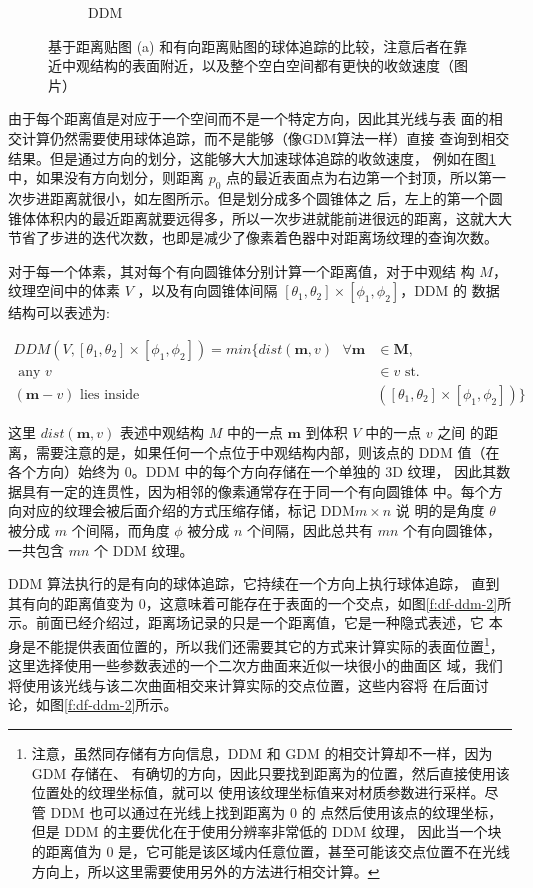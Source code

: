 \begin{figure}
\begin{subfigure}[b]{0.5\textwidth}
		\caption{DDM}
	\end{subfigure}
	\caption{基于距离贴图 (a) 和有向距离贴图的球体追踪的比较，注意后者在靠近中观结构的表面附近，以及整个空白空间都有更快的收敛速度（图片\cite{a:directional-distance-maps}）}
	\label{f:df-ddm-comparision}
\end{figure}

由于每个距离值是对应于一个空间而不是一个特定方向，因此其光线与表 面的相交计算仍然需要使用球体追踪，而不是能够（像GDM算法一样）直接 查询到相交结果。但是通过方向的划分，这能够大大加速球体追踪的收敛速度， 例如在图\ref{f:df-ddm-comparision}中，如果没有方向划分，则距离 $p_0$ 点的最近表面点为右边第一个封顶，所以第一次步进距离就很小，如左图所示。但是划分成多个圆锥体之 后，左上的第一个圆锥体体积内的最近距离就要远得多，所以一次步进就能前进很远的距离，这就大大节省了步进的迭代次数，也即是减少了像素着色器中对距离场纹理的查询次数。

对于每一个体素，其对每个有向圆锥体分别计算一个距离值，对于中观结 构 $M$，纹理空间中的体素 $V$ ，以及有向圆锥体间隔 $[\theta_1, \theta_2] \times [\phi_1, \phi_2]$，DDM 的 数据结构可以表述为:

\begin{equation}
\begin{split}
	DDM(V,[\theta_{1},\theta_{2}]\times [\phi_{1},\phi_{2}])=min\{dist(\mathbf{m},{v})\textrm{ }\forall\mathbf{m} & \in\mathbf{M},\\
	\textrm{ any } {v} & \in{v} \textrm{ st. } \\
	(\mathbf{m}-{v}) \textrm{ lies inside }&([\theta_{1},\theta_{2}]\times [\phi_{1},\phi_{2}])\}
\end{split}
\end{equation}

这里 $dist(\mathbf{m}, {v})$ 表述中观结构 $M$ 中的一点 $\mathbf{m}$ 到体积 $V$ 中的一点 ${v}$ 之间 的距离，需要注意的是，如果任何一个点位于中观结构内部，则该点的 DDM 值（在各个方向）始终为 0。DDM 中的每个方向存储在一个单独的 3D 纹理， 因此其数据具有一定的连贯性，因为相邻的像素通常存在于同一个有向圆锥体 中。每个方向对应的纹理会被后面介绍的方式压缩存储，标记 DDM$m\times n$ 说 明的是角度 $\theta$ 被分成 $m$ 个间隔，而角度 $\phi$ 被分成 $n$ 个间隔，因此总共有 $mn$ 个有向圆锥体，一共包含 $mn$ 个 DDM 纹理。

DDM 算法执行的是有向的球体追踪，它持续在一个方向上执行球体追踪， 直到其有向的距离值变为 0，这意味着可能存在于表面的一个交点，如图\ref{f:df-ddm-2}所 示。前面已经介绍过，距离场记录的只是一个距离值，它是一种隐式表述，它 本身是不能提供表面位置的，所以我们还需要其它的方式来计算实际的表面位置\footnote{注意，虽然同存储有方向信息，DDM 和 GDM 的相交计算却不一样，因为 GDM 存储在、 有确切的方向，因此只要找到距离为的位置，然后直接使用该位置处的纹理坐标值，就可以 使用该纹理坐标值来对材质参数进行采样。尽管 DDM 也可以通过在光线上找到距离为 0 的 点然后使用该点的纹理坐标，但是 DDM 的主要优化在于使用分辨率非常低的 DDM 纹理， 因此当一个块的距离值为 0 是，它可能是该区域内任意位置，甚至可能该交点位置不在光线 方向上，所以这里需要使用另外的方法进行相交计算。}，这里选择使用一些参数表述的一个二次方曲面来近似一块很小的曲面区 域，我们将使用该光线与该二次曲面相交来计算实际的交点位置，这些内容将 在后面讨论，如图\ref{f:df-ddm-2}所示。

